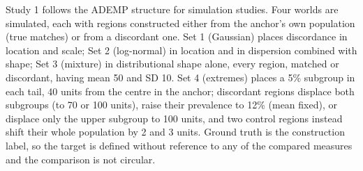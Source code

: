 \documentclass[AMA,Times1COL]{WileyNJDv5}
\begin{document}
Study 1 follows the ADEMP structure for simulation studies.\cite{morris2019} Four worlds are simulated, each with regions constructed either from the anchor's own population (true matches) or from a discordant one. Set 1 (Gaussian) places discordance in location and scale; Set 2 (log-normal) in location and in dispersion combined with shape; Set 3 (mixture) in distributional shape alone, every region, matched or discordant, having mean 50 and SD 10. Set 4 (extremes) places a 5\% subgroup in each tail, 40 units from the centre in the anchor; discordant regions displace both subgroups (to 70 or 100 units), raise their prevalence to 12\% (mean fixed), or displace only the upper subgroup to 100 units, and two control regions instead shift their whole population by 2 and 3 units. Ground truth is the construction label, so the target is defined without reference to any of the compared measures and the comparison is not circular.
\end{document}
